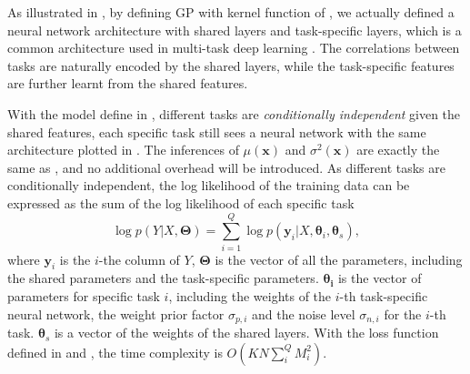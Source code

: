 As illustrated in , by defining GP with kernel function of , we actually defined a neural network architecture with shared layers and task-specific layers, which is a common architecture used in multi-task deep learning \cite{ruder2017overview}. The correlations between tasks are naturally encoded by the shared layers, while the task-specific features are further learnt from the shared features.

With the model define in , different tasks are \emph{conditionally independent} given the shared features, each specific task still sees a neural network with the same architecture plotted in . The inferences of $\mu(\bm{x})$ and $\sigma^2(\bm{x})$ are exactly the same as , and no additional overhead will be introduced. As different tasks are conditionally independent, the log likelihood of the training data can be expressed as the sum of the log likelihood of each specific task
\begin{equation}
    \label{eq:mo_likelihood}
    \log p(Y | X, \bm{\Theta}) = \sum_{i=1}^Q \log p(\bm{y}_i | X, \bm{\theta}_i, \bm{\theta}_s),
\end{equation}
where $\bm{y}_i$ is the $i$-the column of $Y$, $\bm{\Theta}$ is the vector of all the parameters, including the shared parameters and the task-specific parameters. $\bm{\theta_i}$ is the vector of parameters for specific task $i$, including the weights of the $i$-th task-specific neural network, the weight prior factor $\sigma_{p, i}$ and the noise level $\sigma_{n, i}$ for the $i$-th task. $\bm{\theta}_s$ is a vector of the weights of the shared layers. With the loss function defined in  and , the time complexity is $O(KN\sum_i^Q M_i^2)$.
